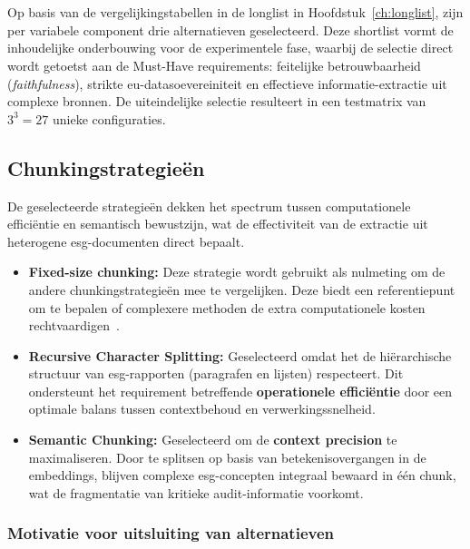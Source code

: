 \chapter{}%
\label{ch:shortlist}

Op basis van de vergelijkingstabellen in de longlist in Hoofdstuk~\ref{ch:longlist}, zijn per variabele component drie alternatieven geselecteerd. Deze shortlist vormt de inhoudelijke onderbouwing voor de experimentele fase, waarbij de selectie direct wordt getoetst aan de Must-Have requirements: feitelijke betrouwbaarheid (\textit{faithfulness}), strikte \gls{eu}-datasoevereiniteit en effectieve informatie-extractie uit complexe bronnen. De uiteindelijke selectie resulteert in een testmatrix van $3^3 = 27$ unieke configuraties.

\section{Chunkingstrategieën}
\label{sec:shortlist-chunking}

De geselecteerde strategieën dekken het spectrum tussen computationele efficiëntie en semantisch bewustzijn, wat de effectiviteit van de extractie uit heterogene \gls{esg}-documenten direct bepaalt.

\begin{itemize}
    \item \textbf{Fixed-size chunking:} Deze strategie wordt gebruikt als nulmeting om de andere chunkingstrategieën mee te vergelijken. Deze biedt een referentiepunt om te bepalen of complexere methoden de extra computationele kosten rechtvaardigen~\autocite{BhatEtAl2025}.
    \item \textbf{Recursive Character Splitting:} Geselecteerd omdat het de hiërarchische structuur van \gls{esg}-rapporten (paragrafen en lijsten) respecteert. Dit ondersteunt het requirement betreffende \textbf{operationele efficiëntie} door een optimale balans tussen contextbehoud en verwerkingssnelheid.
    \item \textbf{Semantic Chunking:} Geselecteerd om de \textbf{context precision} te maximaliseren. Door te splitsen op basis van betekenisovergangen in de embeddings, blijven complexe \gls{esg}-concepten integraal bewaard in één chunk, wat de fragmentatie van kritieke audit-informatie voorkomt.
\end{itemize}

\subsection{Motivatie voor uitsluiting van alternatieven}

